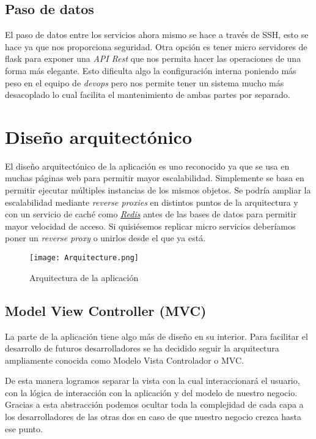 \subsection{Paso de datos}

El paso de datos entre los servicios ahora mismo se hace a través de SSH, esto se hace ya que nos proporciona seguridad. Otra opción es tener micro servidores de flask para exponer una \emph{API Rest} que nos permita hacer las operaciones de una forma más elegante. Esto dificulta algo la configuración interna poniendo más peso en el equipo de \emph{devops} pero nos permite tener un sistema mucho más desacoplado lo cual facilita el mantenimiento de ambas partes por separado.


\section{Diseño arquitectónico}
El diseño arquitectónico de la aplicación es uno reconocido ya que se usa en muchas páginas web para permitir mayor escalabilidad. Simplemente se basa en permitir ejecutar múltiples instancias de los mismos objetos. Se podría ampliar la escalabilidad mediante \emph{reverse proxies} en distintos puntos de la arquitectura y con un servicio de caché como \href{https://redis.io/}{\emph{Redis}} antes de las bases de datos para permitir mayor velocidad de acceso. Si quisiésemos replicar micro servicios deberíamos poner un \emph{reverse proxy} o unirlos desde el que ya está.


\begin{figure}
	\centering
	\texttt{[image: Arquitecture.png]}
	\caption{Arquitectura de la aplicación}\label{fig:Arquitecture.png}
\end{figure}

\subsection{Model View Controller (MVC)}

La parte de la aplicación tiene algo más de diseño en su interior. Para facilitar el desarrollo de futuros desarrolladores se ha decidido seguir la arquitectura ampliamente conocida como Modelo Vista Controlador o MVC. 

De esta manera logramos separar la vista con la cual interaccionará el usuario, con la lógica de interacción con la aplicación y del modelo de nuestro negocio. Gracias a esta abstracción podemos ocultar toda la complejidad de cada capa a los desarrolladores de las otras dos en caso de que nuestro negocio crezca hasta ese punto.

